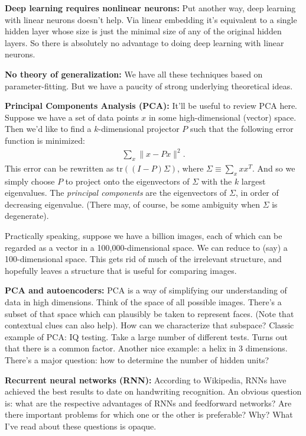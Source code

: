 \documentclass[12pt]{report}
\begin{document}
\textbf{Deep learning requires nonlinear neurons:} Put another way,
deep learning with linear neurons doesn't help.  Via linear embedding
it's equivalent to a single hidden layer whose size is just the
minimal size of any of the original hidden layers.  So there is
absolutely no advantage to doing deep learning with linear neurons.

\textbf{No theory of generalization:} We have all these techniques
based on parameter-fitting.  But we have a paucity of strong
underlying theoretical ideas.

\textbf{Principal Components Analysis (PCA):} It'll be useful to
review PCA here.  Suppose we have a set of data points $x$ in some
high-dimensional (vector) space.  Then we'd like to find a
$k$-dimensional projector $P$ such that the following error function
is minimized:
\begin{eqnarray}
\sum_x \| x-Px \|^2.
\end{eqnarray}
This error can be rewritten as $\mbox{tr}((I-P)\Sigma)$, where $\Sigma
\equiv \sum_x x x^T$.  And so we simply choose $P$ to project onto the
eigenvectors of $\Sigma$ with the $k$ largest eigenvalues.  The
\emph{principal components} are the eigenvectors of $\Sigma$, in order
of decreasing eigenvalue.  (There may, of course, be some ambiguity
when $\Sigma$ is degenerate).

Practically speaking, suppose we have a billion images, each of which
can be regarded as a vector in a 100,000-dimensional space.  We can
reduce to (say) a 100-dimensional space.  This gets rid of much of the
irrelevant structure, and hopefully leaves a structure that is useful
for comparing images.

\textbf{PCA and autoencoders:} PCA is a way of simplifying our
understanding of data in high dimensions.  Think of the space of all
possible images.  There's a subset of that space which can plausibly
be taken to represent faces.  (Note that contextual clues can also
help).  How can we characterize that subspace?  Classic example of
PCA: IQ testing.  Take a large number of different tests.  Turns out
that there is a common factor.  Another nice example: a helix in 3
dimensions.  There's a major question: how to determine the number of
hidden units?

\textbf{Recurrent neural networks (RNN):} According to Wikipedia, RNNs
have achieved the best results to date on handwriting recognition.  An
obvious question is: what are the respective advantages of RNNs and
feedforward networks?  Are there important problems for which one or
the other is preferable?  Why?  What I've read about these questions
is opaque.
\end{document}
